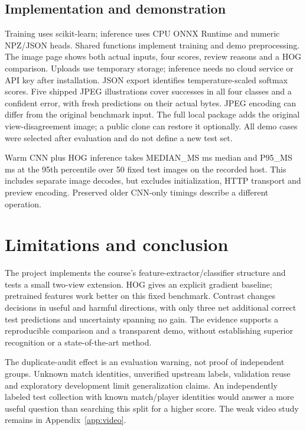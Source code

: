 \subsection{Implementation and demonstration}
Training uses scikit-learn; inference uses CPU ONNX Runtime and numeric NPZ/JSON heads. Shared functions implement training and demo preprocessing. The image page shows both actual inputs, four scores, review reasons and a HOG comparison. Uploads use temporary storage; inference needs no cloud service or API key after installation. JSON export identifies temperature-scaled softmax scores. Five shipped JPEG illustrations cover successes in all four classes and a confident error, with fresh predictions on their actual bytes. JPEG encoding can differ from the original benchmark input. The full local package adds the original view-disagreement image; a public clone can restore it optionally. All demo cases were selected after evaluation and do not define a new test set.

Warm CNN plus HOG inference takes {{MEDIAN_MS}} ms median and {{P95_MS}} ms at the 95th percentile over 50 fixed test images on the recorded host. This includes separate image decodes, but excludes initialization, HTTP transport and preview encoding. Preserved older CNN-only timings describe a different operation.

\section{Limitations and conclusion}
The project implements the course's feature-extractor/classifier structure and tests a small two-view extension. HOG gives an explicit gradient baseline; pretrained features work better on this fixed benchmark. Contrast changes decisions in useful and harmful directions, with only three net additional correct test predictions and uncertainty spanning no gain. The evidence supports a reproducible comparison and a transparent demo, without establishing superior recognition or a state-of-the-art method.

The duplicate-audit effect is an evaluation warning, not proof of independent groups. Unknown match identities, unverified upstream labels, validation reuse and exploratory development limit generalization claims. An independently labeled test collection with known match/player identities would answer a more useful question than searching this split for a higher score. The weak video study remains in Appendix~\ref{app:video}.
